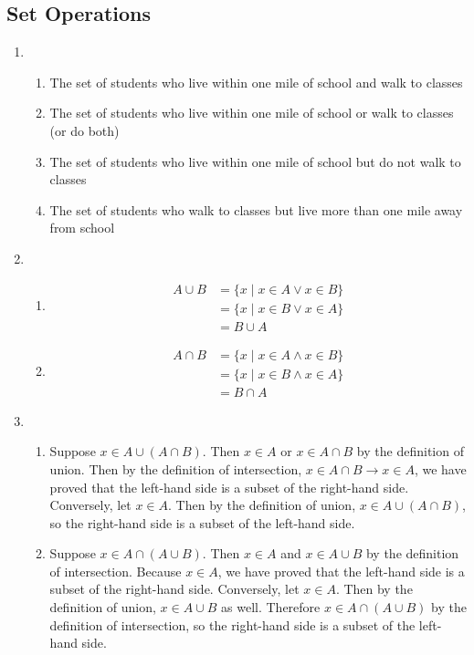 \documentclass{sig-alternate-05-2015}
\begin{document}
\subsection{Set Operations}
\begin{enumerate}
\item 
\begin{enumerate}
	\item The set of students who live within one mile of school
	and walk to classes 
	\item The set of students who live within
	one mile of school or walk to classes (or do both) 
	\item The
	set of students who live within one mile of school but
	do not walk to classes 
	\item The set of students who walk
	to classes but live more than one mile away from school
\end{enumerate}

\item 
\begin{enumerate}
	\item 
	\begin{align}
		A \cup B & = \{x \mid x \in A \vee x \in B\}\\
		& = \{x \mid x \in B \vee x \in A\}\\
		& = B \cup A
	\end{align}
	\item 
	\begin{align}
		A \cap B & = \{x \mid x \in A \wedge x \in B\}\\
		& = \{x \mid x \in B \wedge x \in A\}\\
		& = B \cap A
	\end{align}
\end{enumerate}

\item 
\begin{enumerate}
	\item Suppose $x \in A \cup (A \cap B)$. Then $x \in A$ or $x \in A \cap B$ by the definition of union. Then by the definition of intersection, $x \in A \cap B \rightarrow x \in A$, we have proved that the left-hand side is a subset of the right-hand side. Conversely, let $x \in A$. Then by the definition of union, $x \in A \cup (A \cap B)$, so the right-hand side is
	a subset of the left-hand side.
	\item Suppose $x \in A \cap (A \cup B)$. Then $x \in A$ and
	$x \in A \cup B$ by the definition of intersection. Because $x \in A$,	we have proved that the left-hand side is a subset of the right-hand side. Conversely, let $x \in A$. Then by the definition of
	union, $x \in A \cup B$ as well. Therefore $x \in A \cap (A \cup B)$
	by the definition of intersection, so the right-hand side is
	a subset of the left-hand side.
\end{enumerate}


\end{enumerate}
\end{document}
